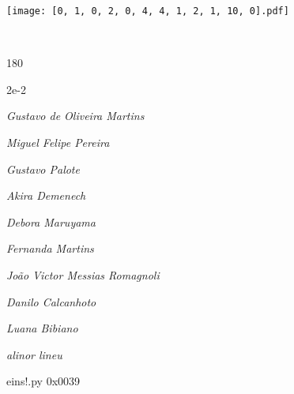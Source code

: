 \documentclass[12pt]{article}
\begin{document}
\texttt{[image: [0, 1, 0, 2, 0, 4, 4, 1, 2, 1, 10, 0].pdf]}


	\hfill	  	  


\pagebreak			

	\ 
	\vfill
	\begin{turn}{180}	
		\begin{minipage}{\textwidth}
		  	\ttfamily %
			\centering
			{\Huge 2e-2}
		  
			\hfill
		  
			

\textit{\small Gustavo de Oliveira Martins}

\textit{\small Miguel Felipe Pereira}

\textit{\small Gustavo Palote}

\textit{\small Akira Demenech}

\textit{\small Debora Maruyama}

\textit{\small Fernanda Martins}

\textit{\small João Victor Messias Romagnoli}

\textit{\small Danilo Calcanhoto}

\textit{\small Luana Bibiano}

\textit{\small alinor lineu}

\bigskip

eins!.py
0x0039


		\end{minipage}	
	\end{turn}
	\vfill
	\

\pagebreak
\end{document}
